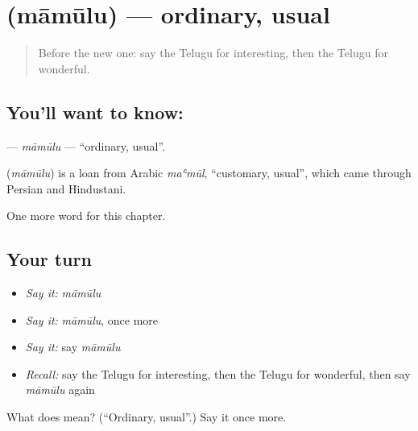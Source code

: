 \section[\texorpdfstring{\te{మామూలు} (māmūlu)}{మామూలు (māmūlu)}]{ (māmūlu) — ordinary, usual}

\label{lesson:TE-C181-mamulu}



\begin{quote}
Before the new one: say the Telugu for interesting, then the Telugu for wonderful.
\end{quote}

\subsection*{You'll want to know: }
\textbf{} — \emph{māmūlu} — \textquotedblleft{}ordinary, usual\textquotedblright{}.

\begin{cousinweb}
\textbf{} (\emph{māmūlu}) is a loan from Arabic \emph{maʿmūl}, \textquotedblleft{}customary, usual\textquotedblright{}, which came through Persian and Hindustani.
\end{cousinweb}

\begin{grammarlens}[title={What you've built}]
One more word for this chapter.
\end{grammarlens}

\subsection*{Your turn}
\begin{itemize}
\raggedright
  \item \emph{Say it:} \emph{māmūlu}
  \item \emph{Say it:} \emph{māmūlu}, once more
  \item \emph{Say it:} say \emph{māmūlu}
  \item \emph{Recall:} say the Telugu for interesting, then the Telugu for wonderful, then say \emph{māmūlu} again
\end{itemize}

\begin{tcolorbox}[breakable,colback=teal!4,colframe=teal!35!black,title={Before you move on}]
What does  mean? (\textquotedblleft{}Ordinary, usual\textquotedblright{}.) Say it once more.
\end{tcolorbox}
